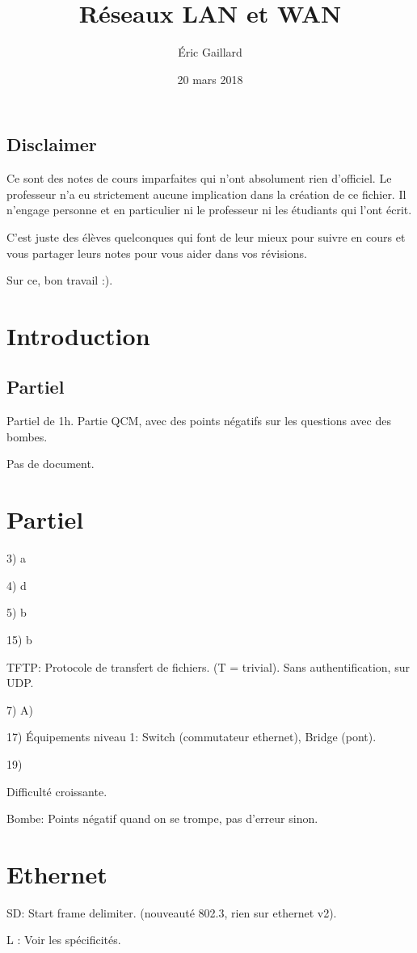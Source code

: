 \documentclass[a4paper,11pt]{article}
\title{Réseaux LAN et WAN}
\author{Éric Gaillard}
\date{20 mars 2018}
\begin{document}
\maketitle
\subsection*{Disclaimer}

Ce sont des notes de cours imparfaites qui n'ont absolument rien d'officiel.
Le professeur n'a eu strictement aucune implication dans la création de ce
fichier. Il n'engage personne et en particulier ni le professeur ni les
étudiants qui l'ont écrit.

C'est juste des élèves quelconques qui font de leur mieux pour suivre en cours
et vous partager leurs notes pour vous aider dans vos révisions.

Sur ce, bon travail :).
\tableofcontents

\section{Introduction}

\subsection{Partiel}

Partiel de 1h. Partie QCM, avec des points négatifs sur les questions avec des
bombes.

Pas de document.

\section{Partiel}

3) a

4) d

5) b

15) b

TFTP: Protocole de transfert de fichiers. (T = trivial). Sans authentification,
sur UDP.

7) A)

17) Équipements niveau 1: Switch (commutateur ethernet), Bridge (pont).

19) 

Difficulté croissante.

Bombe: Points négatif quand on se trompe, pas d'erreur sinon.

\section{Ethernet}

SD: Start frame delimiter. (nouveauté 802.3, rien sur ethernet v2).

L : Voir les spécificités.
\end{document}
